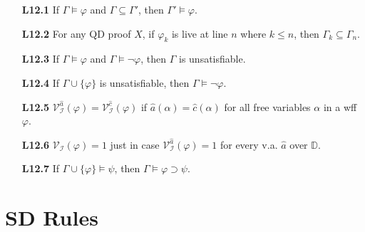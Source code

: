 \documentclass[a4paper, 11pt]{article} %
\newcommand{\set}[1]{\lbrace#1\rbrace} %
\newcommand{\I}{\mathcal{I}}
\newcommand{\D}{\mathbb{D}}
\newcommand{\VV}[2]{\mathcal{V}_{#1}^{#2}} %
\newcommand{\va}[1]{\hat{#1}} %
\renewcommand{\models}{\vDash}
\def\metaA{\ensuremath{\varphi}}
\def\metaB{\ensuremath{\psi}}
\begin{document}
\begin{enumerate}[labelsep=.1in]
  \item[\bf L12.1] If $\Gamma \models \metaA$ and $\Gamma \subseteq \Gamma'$, then $\Gamma' \models \metaA$.
  \item[\bf L12.2] For any QD proof $X$, if $\metaA_k$ is live at line $n$ where $k\leq n$, then $\Gamma_k\subseteq \Gamma_{n}$.
  \item[\bf L12.3] If $\Gamma \models \metaA$ and $\Gamma \models \neg\metaA$, then $\Gamma$ is unsatisfiable.
  \item[\bf L12.4] If $\Gamma \cup \set{\metaA}$ is unsatisfiable, then $\Gamma \models \neg\metaA$.
  \item[\bf L12.5] $\VV{\I}{\va{a}}(\metaA)=\VV{\I}{\va{c}}(\metaA)$ if $\va{a}(\alpha)=\va{c}(\alpha)$ for all free variables $\alpha$ in a wff $\metaA$.
  \item[\bf L12.6] $\VV{\I}{}(\metaA)= 1$ just in case $\VV{\I}{\va{a}}(\metaA)= 1$ for every v.a. $\va{a}$ over $\D$.
  \item[\bf L12.7] If $\Gamma \cup \set{\metaA} \models \metaB$, then $\Gamma \models \metaA \supset \metaB$.
\end{enumerate}




\section*{SD Rules}
\end{document}

